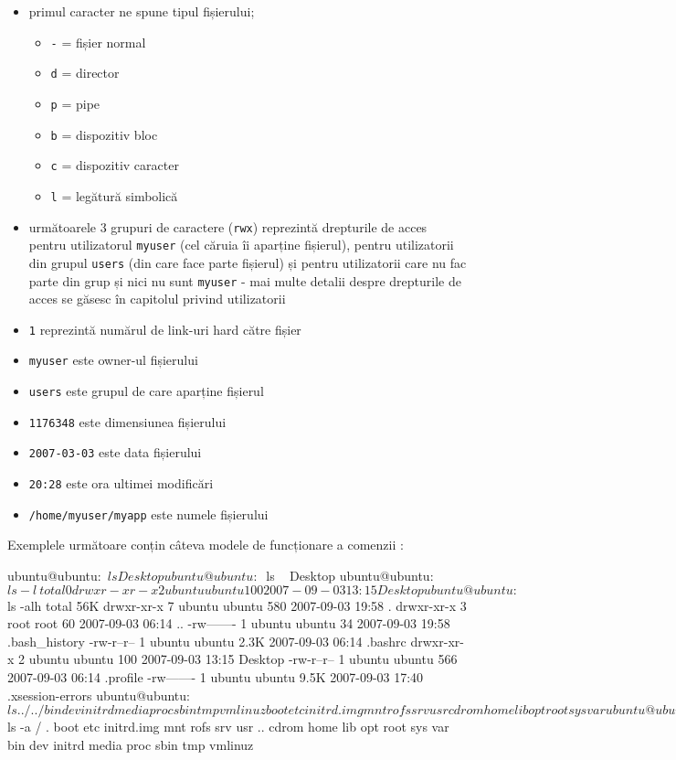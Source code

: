 \begin{itemize}
	\item primul caracter ne spune tipul fișierului;
	\begin{itemize}
		\item \texttt{-} = fișier normal
		\item \texttt{d} = director
		\item \texttt{p} = pipe
		\item \texttt{b} = dispozitiv bloc
		\item \texttt{c} = dispozitiv caracter
		\item \texttt{l} = legătură simbolică
	\end{itemize}
	\item următoarele 3 grupuri de caractere (\texttt{rwx}) reprezintă
		drepturile de acces pentru utilizatorul \texttt{myuser} (cel
		căruia îi aparține fișierul), pentru utilizatorii din grupul
		\texttt{users} (din care face parte fișierul) și pentru
		utilizatorii care nu fac parte din grup și nici nu sunt
		\texttt{myuser} - mai multe detalii despre drepturile de acces
		se găsesc în capitolul privind utilizatorii
	\item \texttt{1} reprezintă numărul de link-uri hard către fișier
	\item \texttt{myuser} este owner-ul fișierului
	\item \texttt{users} este grupul de care aparține fișierul
	\item \texttt{1176348} este dimensiunea fișierului
	\item \texttt{2007-03-03} este data fișierului
	\item \texttt{20:28} este ora ultimei modificări
	\item \texttt{/home/myuser/myapp} este numele fișierului
\end{itemize}


Exemplele următoare conțin câteva modele de funcționare a comenzii :

\begin{screen}
ubuntu@ubuntu:~$ ls
Desktop
ubuntu@ubuntu:~$ ls ~
Desktop
ubuntu@ubuntu:~$ ls -l ~
total 0
drwxr-xr-x 2 ubuntu ubuntu 100 2007-09-03 13:15 Desktop
ubuntu@ubuntu:~$ ls -alh
total 56K
drwxr-xr-x 7 ubuntu ubuntu  580 2007-09-03 19:58 .
drwxr-xr-x 3 root   root         60 2007-09-03 06:14 ..
-rw------- 1 ubuntu ubuntu   34 2007-09-03 19:58 .bash_history
-rw-r--r-- 1 ubuntu ubuntu 2.3K 2007-09-03 06:14 .bashrc
drwxr-xr-x 2 ubuntu ubuntu  100 2007-09-03 13:15 Desktop
-rw-r--r-- 1 ubuntu ubuntu  566 2007-09-03 06:14 .profile
-rw------- 1 ubuntu ubuntu 9.5K 2007-09-03 17:40 .xsession-errors
ubuntu@ubuntu:~$ ls ../../
bin        dev   initrd          media  proc  sbin  tmp  vmlinuz
boot   etc   initrd.img  mnt        rofs  srv   usr
cdrom  home  lib             opt        root  sys   var
ubuntu@ubuntu:~$ ls -a /
.        boot   etc         initrd.img  mnt   rofs  srv  usr
..   cdrom  home        lib             opt   root  sys  var
bin  dev    initrd  media           proc  sbin  tmp  vmlinuz
\end{screen}

